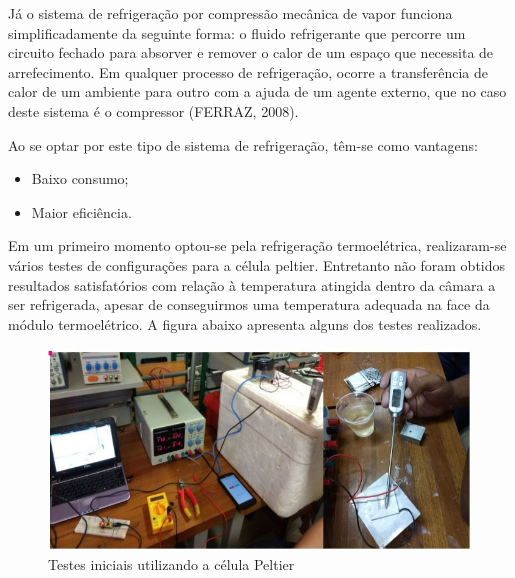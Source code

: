	Já o sistema de refrigeração por compressão mecânica de vapor funciona simplificadamente da seguinte forma: o fluido refrigerante que percorre um circuito fechado para absorver e remover o calor de um espaço que necessita de arrefecimento. Em qualquer processo de refrigeração, ocorre a transferência de calor de um ambiente para outro com a ajuda de um agente externo, que no caso deste sistema é o compressor (FERRAZ, 2008).
	
	Ao se optar por este tipo de sistema de refrigeração, têm-se como vantagens:
	\begin{itemize}
		\item Baixo consumo;
		\item Maior eficiência.
	\end{itemize}

	Em um primeiro momento optou-se pela refrigeração termoelétrica, realizaram-se vários testes de configurações para a célula peltier. Entretanto não foram obtidos resultados satisfatórios com relação à temperatura atingida dentro da câmara a ser refrigerada, apesar de conseguirmos uma temperatura adequada na face da módulo termoelétrico. A figura abaixo apresenta alguns dos testes realizados.
	
	
	\begin{figure}[H]
		\begin{center}
			\includegraphics[scale = 0.8]{figuras/teste_Peltier.JPG}
			\caption{Testes iniciais utilizando a célula Peltier}
		\end{center}
	\end{figure}
	
